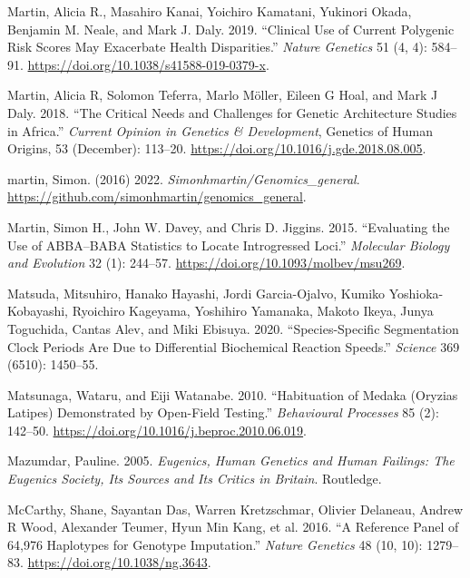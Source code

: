 \documentclass[
]{book}
\newlength{\cslhangindent}
\newlength{\cslentryspacingunit} %
\newenvironment{CSLReferences}[2] %
 {%
  \setlength{\parindent}{0pt}
  \ifodd #1
  \let\oldpar\par
  \def\par{\hangindent=\cslhangindent\oldpar}
  \fi
  \setlength{\parskip}{#2\cslentryspacingunit}
 }%
 {}
\begin{document}
\begin{CSLReferences}{1}{0}
\leavevmode{}%
Martin, Alicia R., Masahiro Kanai, Yoichiro Kamatani, Yukinori Okada, Benjamin M. Neale, and Mark J. Daly. 2019. {``Clinical Use of Current Polygenic Risk Scores May Exacerbate Health Disparities.''} \emph{Nature Genetics} 51 (4, 4): 584--91. \url{https://doi.org/10.1038/s41588-019-0379-x}.

\leavevmode{}%
Martin, Alicia R, Solomon Teferra, Marlo Möller, Eileen G Hoal, and Mark J Daly. 2018. {``The Critical Needs and Challenges for Genetic Architecture Studies in {Africa}.''} \emph{Current Opinion in Genetics \& Development}, Genetics of {Human Origins}, 53 (December): 113--20. \url{https://doi.org/10.1016/j.gde.2018.08.005}.

\leavevmode{}%
martin, Simon. (2016) 2022. \emph{Simonhmartin/Genomics\_general}. \url{https://github.com/simonhmartin/genomics_general}.

\leavevmode{}%
Martin, Simon H., John W. Davey, and Chris D. Jiggins. 2015. {``Evaluating the {Use} of {ABBA}--{BABA Statistics} to {Locate Introgressed Loci}.''} \emph{Molecular Biology and Evolution} 32 (1): 244--57. \url{https://doi.org/10.1093/molbev/msu269}.

\leavevmode{}%
Matsuda, Mitsuhiro, Hanako Hayashi, Jordi Garcia-Ojalvo, Kumiko Yoshioka-Kobayashi, Ryoichiro Kageyama, Yoshihiro Yamanaka, Makoto Ikeya, Junya Toguchida, Cantas Alev, and Miki Ebisuya. 2020. {``Species-Specific Segmentation Clock Periods Are Due to Differential Biochemical Reaction Speeds.''} \emph{Science} 369 (6510): 1450--55.

\leavevmode{}%
Matsunaga, Wataru, and Eiji Watanabe. 2010. {``Habituation of Medaka ({Oryzias} Latipes) Demonstrated by Open-Field Testing.''} \emph{Behavioural Processes} 85 (2): 142--50. \url{https://doi.org/10.1016/j.beproc.2010.06.019}.

\leavevmode{}%
Mazumdar, Pauline. 2005. \emph{Eugenics, Human Genetics and Human Failings: The {Eugenics Society}, Its Sources and Its Critics in {Britain}}. {Routledge}.

\leavevmode{}%
McCarthy, Shane, Sayantan Das, Warren Kretzschmar, Olivier Delaneau, Andrew R Wood, Alexander Teumer, Hyun Min Kang, et al. 2016. {``A Reference Panel of 64,976 Haplotypes for Genotype Imputation.''} \emph{Nature Genetics} 48 (10, 10): 1279--83. \url{https://doi.org/10.1038/ng.3643}.


\end{CSLReferences}
\end{document}

